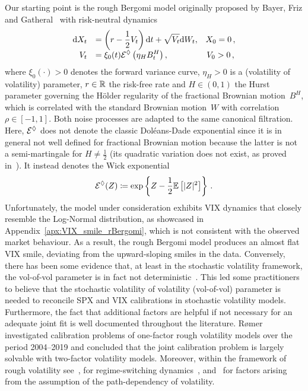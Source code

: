 Our starting point is the rough Bergomi model originally proposed by Bayer, Friz and Gatheral~\cite{Bayer2015PricingVolatility} with risk-neutral dynamics 
\begin{equation}\label{eq:rBergomi_dynamics}
    \begin{array}{rlc}
    \mathrm{d} X_t &= \displaystyle \left(r-\frac{1}{2} V_t\right) \mathrm{d} t+\sqrt{V_t} \mathrm{d} W_t, & X_0=0\,, \\
    V_t &= \displaystyle \xi_0(t) \mathcal{E}^\lozenge\left(\eta_H B_t^{H}\right), & V_0>0\,,
    \end{array}
\end{equation}
where $\xi_0(\cdot)>0$ denotes the forward variance curve, $\eta_H>0$ is a (volatility of volatility) parameter, $r\in\mathbb{R}$ the risk-free rate and $H\in(0,1)$ the Hurst parameter governing the H{\"o}lder regularity of the fractional Brownian motion~$B^H$,
which is correlated with the standard Brownian motion~$W$ with correlation $\rho\in[-1,1]$. Both noise processes are adapted to the same canonical filtration.
Here, $\mathcal{E}^\lozenge$ does not denote the classic Dol{\'e}ans-Dade exponential since it is in general not well defined for fractional Brownian motion because the latter is not a semi-martingale for $H \ne\frac12$ (its quadratic variation does not exist, as proved in~\cite{Rogers1997ArbitrageMotion}). 
It instead denotes the Wick exponential 
\[
\mathcal{E}^\lozenge(Z)\coloneqq \exp\left\{Z-\frac{1}{2}\mathbb{E}\left[|Z|^2\right]\right\}\,.
\]
Unfortunately, the model under consideration exhibits VIX dynamics that closely resemble the Log-Normal distribution, as showcased in Appendix~\ref{apx:VIX_smile_rBergomi}, which is not consistent with the observed market behaviour. As a result, the rough Bergomi model produces an almost flat VIX smile, deviating from the upward-sloping smiles in the data. Conversely, there has been some evidence that, at least in the stochastic volatility framework, the vol-of-vol parameter is in fact not deterministic~\cite{Barndorff-Nielsen2009StochasticTime, Barndorff-Nielsen2013StochasticPremia, Fouque2018HestonOptions}. This led some practitioners to believe that the stochastic volatility of volatility (vol-of-vol) parameter is needed to reconcile SPX and VIX calibrations in stochastic volatility models. Furthermore, the fact that additional factors are helpful if not necessary for an adequate joint fit is well documented throughout the literature. R{\o}mer~\cite{Rmer2022EmpiricalMarkets} investigated calibration problems of one-factor rough volatility models over the period 2004–2019 and concluded that the joint calibration problem is largely solvable with two-factor volatility models. Moreover, within the framework of rough volatility see~\cite{Jacquier2021RoughOptions}, for regime-switching dynamics~\cite{Goutte2017Regime-switchingOptions}, and~\cite{Guyon2022VolatilityPath-Dependent} for factors arising from the assumption of the path-dependency of volatility.

